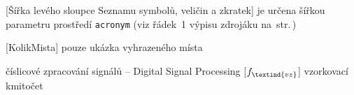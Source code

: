 \cleardoublepage
\chapter*{\listofabbrevname}
{}

\begin{acronym}[KolikMista]

		[Šířka levého sloupce Seznamu symbolů, veličin a zkratek]								%
		{je určena šířkou parametru prostředí \texttt{acronym} (viz řádek~1 výpisu zdrojáku na~str.\,\pageref{lst:zkratky})}

		[KolikMista]
		{pouze ukázka vyhrazeného místa}

		{číslicové zpracování signálů -- Digital Signal Processing}
		[\ensuremath{f_\textind{vz}}] %
		{vzorkovací kmitočet}					%

\end{acronym}
